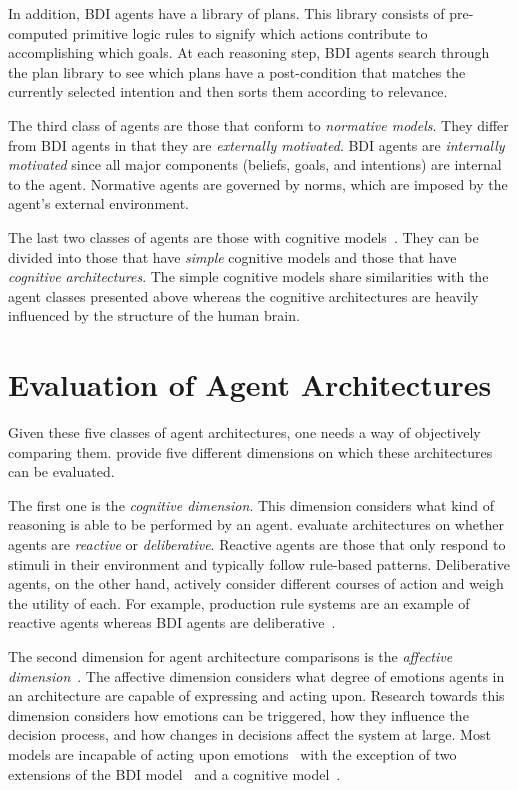 In addition, BDI agents have a library of plans.
This library consists of pre-computed primitive logic rules to signify which actions contribute to accomplishing which goals.
At each reasoning step, BDI agents search through the plan library to see which plans have a post-condition that matches the currently selected intention
and then sorts them according to relevance.

The third class of agents are those that conform to \textit{normative models}.
They differ from BDI agents in that they are \textit{externally motivated}.
BDI agents are \textit{internally motivated} since all major components (beliefs, goals, and intentions) are internal to the agent.
Normative agents are governed by norms, which are imposed by the agent's external environment.

The last two classes of agents are those with cognitive models~\citep{balke_how_2014}.
They can be divided into those that have \textit{simple} cognitive models and those that have \textit{cognitive architectures}.
The simple cognitive models share similarities with the agent classes presented above
whereas the cognitive architectures are heavily influenced by the structure of the human brain.

\section{Evaluation of Agent Architectures}
\label{sec:agent_evaluation}

Given these five classes of agent architectures, one needs a way of objectively comparing them.
\citet{balke_how_2014} provide five different dimensions on which these architectures can be evaluated.

The first one is the \textit{cognitive dimension}.
This dimension considers what kind of reasoning is able to be performed by an agent.
\citeauthor{balke_how_2014} evaluate architectures on whether agents are \textit{reactive} or \textit{deliberative}.
Reactive agents are those that only respond to stimuli in their environment and typically follow rule-based patterns.
Deliberative agents, on the other hand, actively consider different courses of action and weigh the utility of each.
For example, production rule systems are an example of reactive agents whereas BDI agents are deliberative~\citep{balke_how_2014}.

The second dimension for agent architecture comparisons is the \textit{affective dimension}~\citep{balke_how_2014}.
The affective dimension considers what degree of emotions agents in an architecture are capable of expressing and acting upon.
Research towards this dimension considers how emotions can be triggered, how they influence the decision process, and how changes in decisions affect the system at large.
Most models are incapable of acting upon emotions~\citep{balke_how_2014} with the exception of two extensions of the BDI model~\citep{jiang_ebdi_2007, dignum_towards_2009} and a cognitive model~\citep{urban_pecs_2000}.

